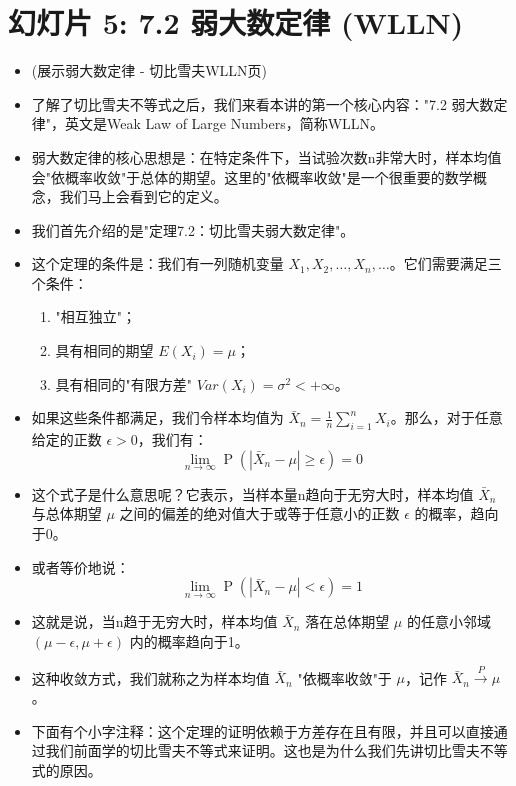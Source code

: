 \documentclass[UTF8]{article} %
\DeclareMathOperator{\Prob}{\operatorname{P}}
\begin{document}
\section*{幻灯片 5: 7.2 弱大数定律 (WLLN)}
\begin{itemize}
    \itemsep1em
    \item (展示弱大数定律 - 切比雪夫WLLN页)
    \item 了解了切比雪夫不等式之后，我们来看本讲的第一个核心内容："7.2 弱大数定律"，英文是Weak Law of Large Numbers，简称WLLN。
    \item 弱大数定律的核心思想是：在特定条件下，当试验次数n非常大时，样本均值会"依概率收敛"于总体的期望。这里的"依概率收敛"是一个很重要的数学概念，我们马上会看到它的定义。
    \item 我们首先介绍的是"定理7.2：切比雪夫弱大数定律"。
    \item 这个定理的条件是：我们有一列随机变量 $X_1, X_2, \dots, X_n, \dots$。它们需要满足三个条件：
    \begin{enumerate}[label=(\roman*), itemsep=0.3em]
        \item "相互独立"；
        \item 具有相同的期望 $E(X_i) = \mu$；
        \item 具有相同的"有限方差" $Var(X_i) = \sigma^2 < +\infty$。
    \end{enumerate}
    \item 如果这些条件都满足，我们令样本均值为 $\bar{X}_n = \frac{1}{n} \sum_{i=1}^{n} X_i$。那么，对于任意给定的正数 $\epsilon > 0$，我们有：
    \[ \lim_{n \to \infty} \Prob(|\bar{X}_n - \mu| \geq \epsilon) = 0 \]
    \item 这个式子是什么意思呢？它表示，当样本量n趋向于无穷大时，样本均值 $\bar{X}_n$ 与总体期望 $\mu$ 之间的偏差的绝对值大于或等于任意小的正数 $\epsilon$ 的概率，趋向于0。
    \item 或者等价地说：
    \[ \lim_{n \to \infty} \Prob(|\bar{X}_n - \mu| < \epsilon) = 1 \]
    \item 这就是说，当n趋于无穷大时，样本均值 $\bar{X}_n$ 落在总体期望 $\mu$ 的任意小邻域 $(\mu-\epsilon, \mu+\epsilon)$ 内的概率趋向于1。
    \item 这种收敛方式，我们就称之为样本均值 $\bar{X}_n$ "依概率收敛"于 $\mu$，记作 $\bar{X}_n \xrightarrow{P} \mu$。
    \item 下面有个小字注释：这个定理的证明依赖于方差存在且有限，并且可以直接通过我们前面学的切比雪夫不等式来证明。这也是为什么我们先讲切比雪夫不等式的原因。
\end{itemize}
\end{document}
